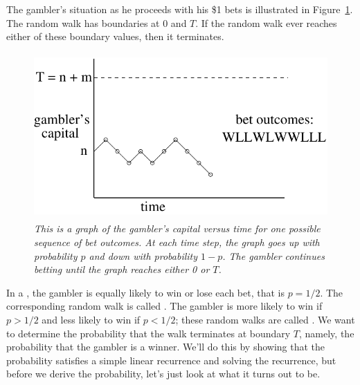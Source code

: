 The gambler's situation as he proceeds with his \$1 bets is illustrated in
Figure~\ref{LN12:fig:walk1}.  The random walk has boundaries at 0 and $T$.  If
the random walk ever reaches either of these boundary values, then it
terminates.

\begin{figure}
  \centerline{\includegraphics[height=2.5in]{figures/walk1}}
  \caption{\em This is a graph of the gambler's capital versus time
  for one possible sequence of bet outcomes.  At each time step, the
  graph goes up with probability $p$ and down with probability $1-p$.
  The gambler continues betting until the graph reaches either 0 or $T$.}
  \label{LN12:fig:walk1}
\end{figure}

In a , the gambler is equally likely to win or lose
each bet, that is $p = 1/2$.  The corresponding random walk is called
.  The gambler is more likely to win if $p>1/2$ and
less likely to win if $p<1/2$; these random walks are called
.  We want to determine the probability that the walk
terminates at boundary $T$, namely, the probability that the gambler
is a winner.  We'll do this by showing that the probability satisfies
a simple linear recurrence and solving the recurrence, but before we
derive the probability, let's just look at what it turns out to be.

